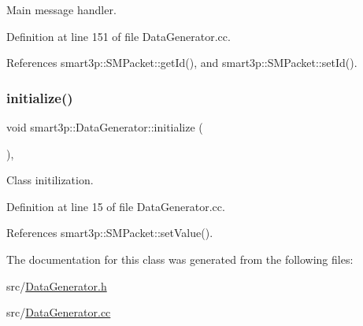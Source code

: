 Main message handler. 



Definition at line 151 of file Data\+Generator.\+cc.



References smart3p\+::\+S\+M\+Packet\+::get\+Id(), and smart3p\+::\+S\+M\+Packet\+::set\+Id().

\mbox{\label{classsmart3p_1_1DataGenerator_a0a4e7108a50c24c2485645d314892581}} 
\subsubsection{\texorpdfstring{initialize()}{initialize()}}
{\footnotesize\ttfamily void smart3p\+::\+Data\+Generator\+::initialize (\begin{DoxyParamCaption}{ }\end{DoxyParamCaption})\hspace{0.3cm}{\ttfamily [protected]}, {\ttfamily [virtual]}}



Class initilization. 



Definition at line 15 of file Data\+Generator.\+cc.



References smart3p\+::\+S\+M\+Packet\+::set\+Value().



The documentation for this class was generated from the following files\+:\begin{DoxyCompactItemize}
\item 
src/\hyperlink{DataGenerator_8h}{Data\+Generator.\+h}\item 
src/\hyperlink{DataGenerator_8cc}{Data\+Generator.\+cc}\end{DoxyCompactItemize}
